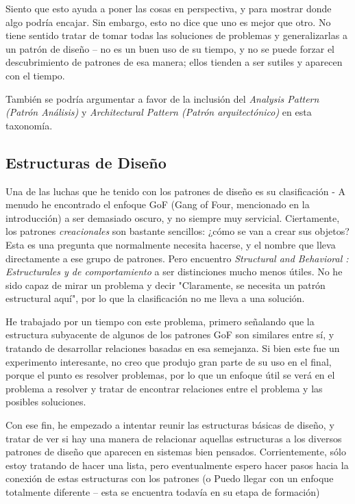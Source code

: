 Siento que esto ayuda a poner las cosas en perspectiva, y para mostrar donde algo podría encajar. Sin embargo, esto no dice que uno es mejor que otro. No tiene sentido tratar de tomar todas las soluciones de problemas y generalizarlas a un patrón de diseño – no es un buen uso de su tiempo, y no se puede forzar el descubrimiento de patrones de esa manera; ellos tienden a ser sutiles y aparecen con el tiempo.     \newline

También se podría argumentar a favor de la inclusión del \textit{Analysis Pattern (Patrón Análisis)} y \textit{Architectural Pattern (Patrón arquitectónico)} en esta taxonomía.

\newpage

\subsection*{Estructuras de Diseño}
\label{subsec:estd}

Una de las luchas que he tenido con los patrones de diseño es su clasificación - A menudo he encontrado el enfoque GoF (Gang of Four, mencionado en la introducción) a ser demasiado oscuro, y no siempre muy servicial. Ciertamente, los patrones \textit{creacionales} son bastante sencillos: ¿cómo se van a crear sus objetos? Esta es una pregunta que normalmente necesita hacerse, y el nombre que lleva directamente a ese grupo de patrones. Pero encuentro \textit{Structural and Behavioral : Estructurales y de comportamiento} a ser distinciones mucho menos útiles. No he sido capaz de mirar un problema y decir "Claramente, se necesita un patrón estructural aquí", por lo que la clasificación no me lleva a una solución.  \newline

He trabajado por un tiempo con este problema, primero señalando que la estructura subyacente de algunos de los patrones GoF son similares entre sí, y tratando de desarrollar relaciones basadas en esa semejanza. 
Si bien este fue un experimento interesante, no creo que produjo gran parte de su uso en el final, porque el punto es resolver problemas, por lo que un enfoque útil se verá en el problema a resolver y tratar de encontrar relaciones entre el problema y las posibles soluciones. \newline

Con ese fin, he empezado a intentar reunir las estructuras básicas de diseño, y tratar de ver si hay una manera de relacionar aquellas estructuras a los diversos patrones de diseño que aparecen en sistemas bien pensados. Corrientemente, sólo estoy tratando de hacer una lista, pero eventualmente espero hacer pasos hacia la conexión de estas estructuras con los patrones (o Puedo llegar con un enfoque totalmente diferente – esta se encuentra todavía en su etapa de formación)  \newline

